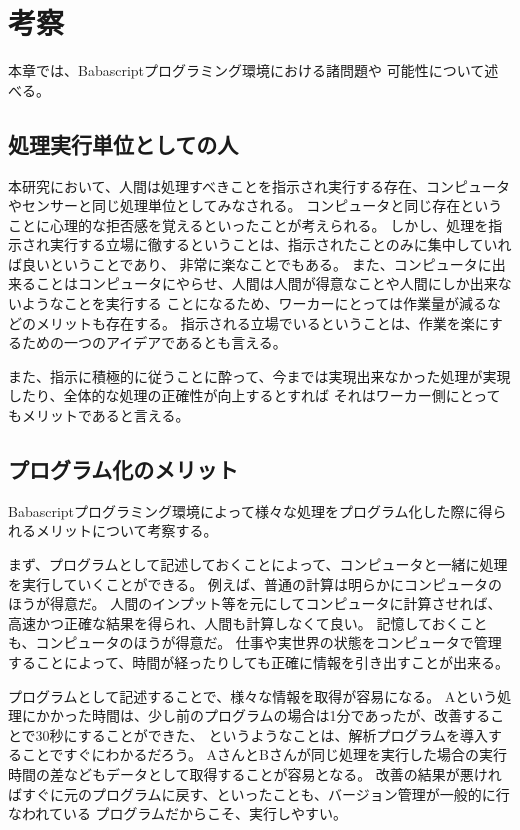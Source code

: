 \chapter{考察}\label{chap:discussion}

本章では、Babascriptプログラミング環境における諸問題や
可能性について述べる。

\newpage

\section{処理実行単位としての人}\label{ux51e6ux7406ux5b9fux884cux5358ux4f4dux3068ux3057ux3066ux306eux4eba}

本研究において、人間は処理すべきことを指示され実行する存在、コンピュータやセンサーと同じ処理単位としてみなされる。
コンピュータと同じ存在ということに心理的な拒否感を覚えるといったことが考えられる。
しかし、処理を指示され実行する立場に徹するということは、指示されたことのみに集中していれば良いということであり、
非常に楽なことでもある。
また、コンピュータに出来ることはコンピュータにやらせ、人間は人間が得意なことや人間にしか出来ないようなことを実行する
ことになるため、ワーカーにとっては作業量が減るなどのメリットも存在する。
指示される立場でいるということは、作業を楽にするための一つのアイデアであるとも言える。

また、指示に積極的に従うことに酔って、今までは実現出来なかった処理が実現したり、全体的な処理の正確性が向上するとすれば
それはワーカー側にとってもメリットであると言える。

\section{プログラム化のメリット}\label{ux30d7ux30edux30b0ux30e9ux30e0ux5316ux306eux30e1ux30eaux30c3ux30c8}

Babascriptプログラミング環境によって様々な処理をプログラム化した際に得られるメリットについて考察する。

まず、プログラムとして記述しておくことによって、コンピュータと一緒に処理を実行していくことができる。
例えば、普通の計算は明らかにコンピュータのほうが得意だ。
人間のインプット等を元にしてコンピュータに計算させれば、高速かつ正確な結果を得られ、人間も計算しなくて良い。
記憶しておくことも、コンピュータのほうが得意だ。
仕事や実世界の状態をコンピュータで管理することによって、時間が経ったりしても正確に情報を引き出すことが出来る。

プログラムとして記述することで、様々な情報を取得が容易になる。
Aという処理にかかった時間は、少し前のプログラムの場合は1分であったが、改善することで30秒にすることができた、
というようなことは、解析プログラムを導入することですぐにわかるだろう。
AさんとBさんが同じ処理を実行した場合の実行時間の差などもデータとして取得することが容易となる。
改善の結果が悪ければすぐに元のプログラムに戻す、といったことも、バージョン管理が一般的に行なわれている
プログラムだからこそ、実行しやすい。


